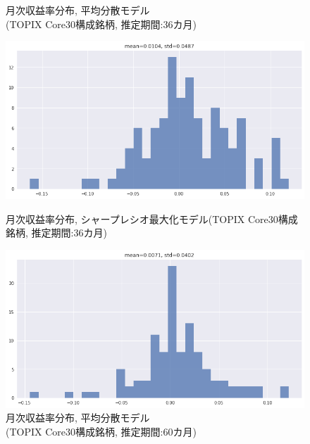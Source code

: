 \documentclass[dvipdfmx,autodetect-engine]{jsarticle}
\begin{document}
\begin{figure}[htbp]
\begin{minipage}{0.5\hsize}
\begin{center}
\end{center}
\caption{\small 月次収益率分布, 平均分散モデル\\(TOPIX Core30構成銘柄, 推定期間:36カ月)}
\label{fig:21}
\end{minipage}
\begin{minipage}{0.5\hsize}
\begin{center}
\includegraphics[width=1.0\hsize]{./figures/srmp_tpx30_w=36_hist.png}
\end{center}
\caption{\small 月次収益率分布, シャープレシオ最大化モデル(TOPIX Core30構成銘柄, 推定期間:36カ月)}
\label{fig:22}
\end{minipage}
\begin{minipage}{0.5\hsize}
\begin{center}
\includegraphics[width=1.0\hsize]{./figures/mmvp_tpx30_w=60_hist.png}
\end{center}
\caption{\small 月次収益率分布, 平均分散モデル\\(TOPIX Core30構成銘柄, 推定期間:60カ月)}
\label{fig:31}
\end{minipage}
\begin{minipage}{0.5\hsize}

\end{minipage}
\end{figure}
\end{document}

